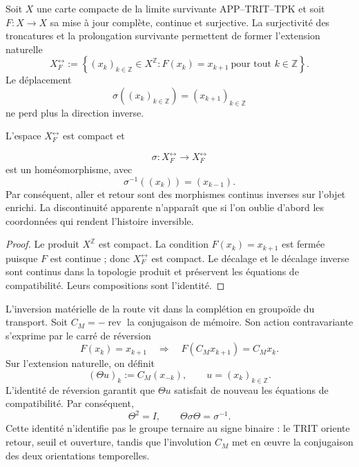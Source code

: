 Soit \(X\) une carte compacte de la limite survivante APP--TRIT--TPK et soit
\(F:X\to X\) sa mise à jour complète, continue et surjective. La
surjectivité des
troncatures et la prolongation survivante permettent de former l'extension
naturelle
\begin{equation}
 X_F^{\leftrightarrow}
 :=\left\{(x_k)_{k\in\mathbb Z}\in X^{\mathbb Z}:
 F(x_k)=x_{k+1}\ \text{pour tout }k\in\mathbb Z\right\}.
 \label{p12-83-c19-s1:hmtch:eq-extension-natural-two-way}
\end{equation}
Le déplacement
\[
 \sigma((x_k)_{k\in\mathbb Z})=(x_{k+1})_{k\in\mathbb Z}
\]
ne perd plus la direction inverse.

\begin{theorem}
\label{p12-83-c19-s1:hmtch:thm-extension-natural-two-way}
L'espace \(X_F^{\leftrightarrow}\) est compact et

\[
 \sigma:X_F^{\leftrightarrow}\longrightarrow X_F^{\leftrightarrow}
\]
est un homéomorphisme, avec
\[
 \sigma^{-1}((x_k))=(x_{k-1}).
\]
Par conséquent, aller et retour sont des morphismes continus inverses sur l'objet
enrichi. La discontinuité apparente n'apparaît que si l'on oublie d'abord
les coordonnées qui rendent l'histoire inversible.
\end{theorem}

\begin{proof}
Le produit \(X^{\mathbb Z}\) est compact. La condition
\(F(x_k)=x_{k+1}\) est fermée puisque \(F\) est continue ; donc
\(X_F^{\leftrightarrow}\) est compact. Le décalage et le
décalage inverse sont continus dans la topologie produit et préservent
les équations de compatibilité. Leurs compositions sont l'identité.
\end{proof}

L'inversion matérielle de la route vit dans la complétion en groupoïde du
transport. Soit \(C_M=-\operatorname{rev}\) la conjugaison de mémoire. Son
action contravariante s'exprime par le carré de réversion
\[
 F(x_k)=x_{k+1}
 \quad\Longrightarrow\quad
 F(C_Mx_{k+1})=C_Mx_k.
\]
Sur l'extension naturelle, on définit
\begin{equation}
 (\Theta u)_k:=C_M(x_{-k}),
 \qquad u=(x_k)_{k\in\mathbb Z}.
 \label{p12-83-c19-s1:hmtch:eq-definicion-espejo-two-way}
\end{equation}
L'identité de réversion garantit que \(\Theta u\) satisfait de nouveau
les équations de compatibilité. Par conséquent,
\begin{equation}
 \Theta^2=I,
 \qquad
 \Theta\sigma\Theta=\sigma^{-1}.
 \label{p12-83-c19-s1:hmtch:eq-espejo-inversion-two-way}
\end{equation}
Cette identité n'identifie pas le groupe ternaire au signe binaire : le
TRIT oriente retour, seuil et ouverture, tandis que l'involution \(C_M\)
met en œuvre la conjugaison des deux orientations temporelles.

